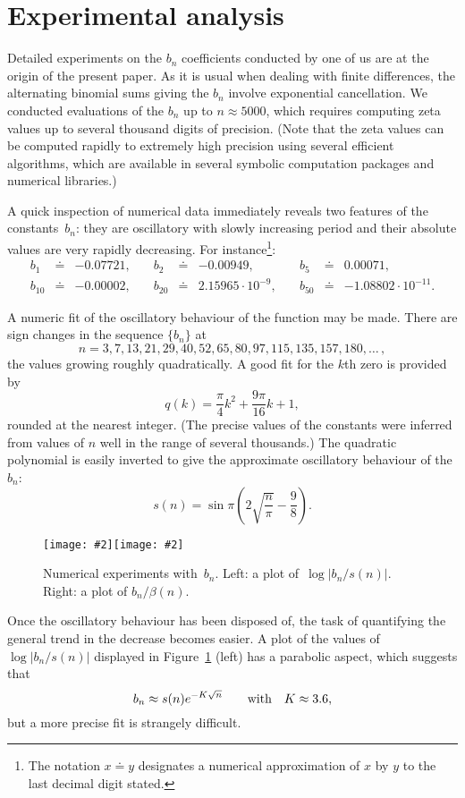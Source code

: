 \documentclass{amsart}
\newcommand{\Img}[2]{\texttt{[image: \#2]}}
\begin{document}
\section{Experimental analysis}

Detailed experiments on the $b_n$ coefficients conducted by one of us are
at the origin of the present paper. As it is usual when dealing with finite differences,
the alternating binomial sums giving the $b_n$ involve exponential
cancellation. We conducted evaluations of the $b_n$ up to $n\approx 5000$,
which requires computing zeta values up to several thousand digits of precision.
(Note that the zeta values can be computed rapidly to extremely high
precision using several efficient algorithms, which are available in several
symbolic computation packages and numerical libraries.)

A quick inspection of numerical data immediately reveals two features
of the constants~$b_n$: they are oscillatory with slowly increasing
period and their
absolute values are very rapidly decreasing. For instance\footnote{%
	The notation $x\doteq y$ designates a numerical approximation of
	$x$ by $y$ to the last decimal digit stated. 
}:
\[\renewcommand{\arraycolsep}{2truept}
\begin{array}{lllllllll}
b_1&\doteq&-	0.07721,\quad &
b_2&\doteq&-	0.00949,\quad &
b_5&\doteq& 	0.00071, \\
b_{10}&\doteq&-	0.00002, \quad &
b_{20}&\doteq& 	2.15965\cdot 10^{-9},\quad &
b_{50}&\doteq&-	1.08802\cdot 10^{-11}.
\end{array}\]

A numeric fit of the oscillatory behaviour of the function may be made.
There are sign changes in the sequence $\{b_n\}$ at
\[
n=3,7,13,21,29,40,52,65,80,97,115,135,157,180,\ldots\,,
\]
the values growing roughly quadratically. A good fit for the $k$th zero is
provided by
\[
q(k)= \frac{\pi}{4}k^2+\frac{9\pi}{16}k+1,\]
rounded at the  nearest integer. (The precise values of the constants were inferred from
values of $n$ well in the range of several thousands.)
The quadratic polynomial is easily 
inverted to give the approximate oscillatory behaviour of the $b_n$:
\[
s(n) = \sin\pi\left(2\sqrt{\frac{n}{\pi}}-\frac{9}{8}\right).\]

\begin{figure}

\begin{center}
\hbox{\Img{6}{exper1.jpg}\Img{6}{exper2.jpg}}
\end{center}

\caption{\label{exper-fig}
Numerical experiments with~$b_n$. Left: a plot of~$\log|b_n/s(n)|$.
Right: a plot of $b_n/\beta(n)$.}
\end{figure}
Once the oscillatory behaviour has been disposed of, the task of quantifying
the general trend in the decrease becomes easier. A plot of the values 
of $\log|b_n/s(n)|$ displayed in Figure~\ref{exper-fig} (left)
has a parabolic aspect, which suggests that
\[
b_n \approx s(n) e^{-K\sqrt{n}} \qquad \hbox{with}\quad K\approx 3.6,\]
but a more precise fit  is strangely difficult. 
\end{document}
